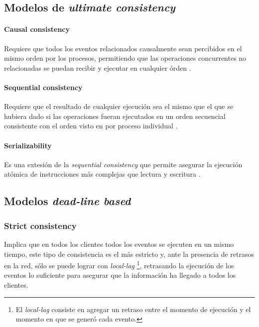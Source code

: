\subsection{Modelos de \emph{ultimate consistency}}

\paragraph{Causal consistency} Requiere que todos los eventos relacionados causalmente sean percibidos en el mismo orden por los procesos, permitiendo que las operaciones concurrentes no relacionadas se puedan recibir y ejecutar en cualquier órden \cite{lamport1978time}.

\paragraph{Sequential consistency} Requiere que el resultado de cualquier ejecución sea el mismo que el que se hubiera dado si las operaciones fueran ejecutados en un orden secuencial consistente con el orden visto en por proceso individual \cite{lamport1979make}.

\paragraph{Serializability} Es una extesión de la \emph{sequential consistency} que permite asegurar la ejecución atómica de instrucciones más complejas que lectura y escritura \cite{bernstein1987rrency}.

\subsection{Modelos \emph{dead-line based}}

\subsubsection{Strict consistency}

Implica que en todos los clientes todos los eventos se ejecuten en un mismo tiempo, este tipo de consistencia es el más estricto y, ante la presencia de retrasos en la red, sólo se puede lograr con \emph{local-lag} \footnote{El \emph{local-lag} consiste en agregar un retraso entre el momento de ejecución y el momento en que se generó cada evento.}, retrasando la ejecución de los eventos lo suficiente para asegurar que la información ha llegado a todos los clientes.

